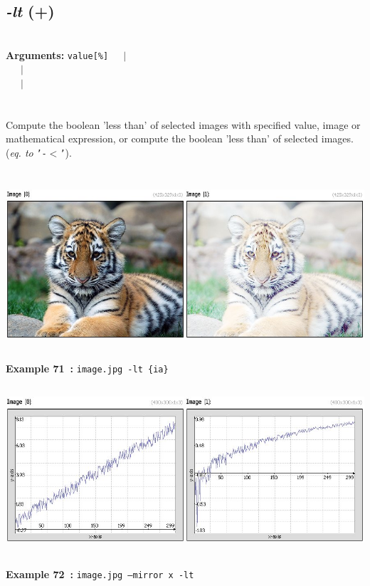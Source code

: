 \documentclass[a4paper,11pt,twoside]{book}
\begin{document}
\subsection{\emph{-lt} (+)}\vspace*{-0.5em}
~\\\textbf{Arguments: } 
{\small \texttt{value[\%]}}~~~$|$\\
\hspace*{2.2cm}{\small \texttt{[image]}}~~~$|$\\
~~~$|$\\
\\~\\
Compute the boolean 'less than' of selected images with specified value, image or
mathematical expression, or compute the boolean 'less than' of selected images.
~\\(\emph{eq. to} {\small \texttt{'-$<$'}}).
\begin{center}\includegraphics[keepaspectratio=true,height=7cm,width=\textwidth]{img/gmic_def71.jpg}\\
{\footnotesize \textbf{Example 71~:} \texttt{image.jpg -lt \{ia\}}}
\\\includegraphics[keepaspectratio=true,height=7cm,width=\textwidth]{img/gmic_def72.jpg}\\
{\footnotesize \textbf{Example 72~:} \texttt{image.jpg --mirror x -lt}}
\end{center}
\end{document}
